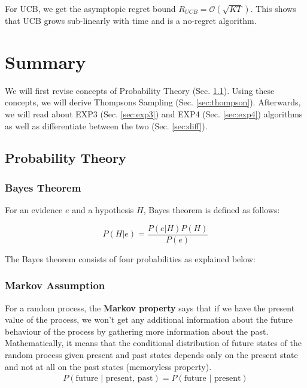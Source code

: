 \documentclass[11pt]{article}
\begin{document}
For UCB, we get the asymptopic regret bound $R_{UCB} = \mathcal{O}(\sqrt{KT})$. This shows that UCB grows sub-linearly with time and is a no-regret algorithm.

\section{Summary}
We will first revise concepts of Probability Theory (Sec. \ref{sec:prob}). Using these concepts, we will derive Thompsons Sampling (Sec. \ref{sec:thompson}). Afterwards, we will read about EXP3 (Sec. \ref{sec:exp3}) and EXP4 (Sec. \ref{sec:exp4}) algorithms as well as differentiate between the two (Sec. \ref{sec:diff}).


\subsection{Probability Theory}
\label{sec:prob}

\subsubsection{Bayes Theorem}

For an evidence $e$ and a hypothesis $H$, Bayes theorem is defined as follows:

\begin{equation}
    P(H|e) = \frac{P(e|H)P(H)}{P(e)}
    \label{eq: bayes}
\end{equation}

The Bayes theorem consists of four probabilities as explained below:
\normalfont
{}
\normalfont
{}
\normalfont
{}
\normalfont

\subsubsection{Markov Assumption}
For a random process, the \textbf{Markov property} \cite{markovproperty} says that if we have the present value of the process, we won't get any additional information about the future behaviour of the process by gathering more information about the past. Mathematically, it means that the conditional distribution of future states of the random process given present and past states depends only on the present state and not at all on the past states (memoryless property).
\begin{align}
    P(\text{future } | \text{ present, past}) = P(\text{future } | \text{ present})
\end{align}
\end{document}
